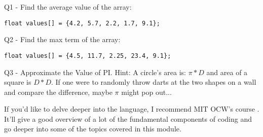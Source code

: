 \documentclass[a4paper]{article}
\begin{document}
Q1 - Find the average value of the array:
\begin{verbatim}
float values[] = {4.2, 5.7, 2.2, 1.7, 9.1};
\end{verbatim}
Q2 - Find the max term of the array:
\begin{verbatim}
float values[] = {4.5, 11.7, 2.25, 23.4, 9.1};
\end{verbatim}
Q3 - Approximate the Value of PI. Hint: A circle's area is: $\pi*D$ and area of a square is $D*D$. If one were to randomly throw darts at the two shapes on a wall and compare the difference, maybe $\pi$ might pop out...

If you'd like to delve deeper into the language, I recommend MIT OCW's course \cite{mit_course}. It'll give a good overview of a lot of the fundamental components of coding and go deeper into some of the topics covered in this module.



\end{document}
